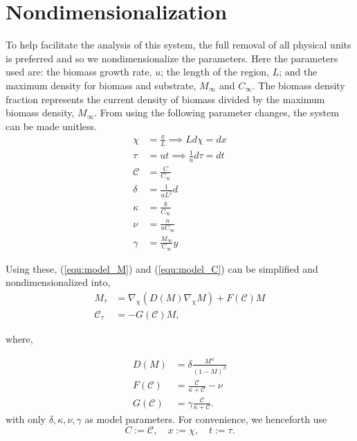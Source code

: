\section{Nondimensionalization}
 

To help facilitate the analysis of this system, the full removal of all physical units is preferred and so we nondimensionalize the parameters.
Here the parameters used are: the biomass growth rate, $u$; the length of the region, $L$; and the maximum density for biomass and substrate, $M_\infty$ and $C_\infty$.
The biomass density fraction represents the current density of biomass divided by the maximum biomass density, $M_{\infty}$.
From using the following parameter changes, the system can be made unitless.
\begin{align}
  \chi &= \frac{x}{L} \implies L d\chi= dx \\
  \tau &= u t \implies \frac{1}{u} d\tau= dt \\
  \mathcal{C} &= \frac{C}{C_{\infty}} \\
  \delta &= \frac{1}{u L^2} d \\
  \kappa &= \frac{k}{C_\infty} \\
  \nu &= \frac{n}{u C_\infty} \\
  \gamma &= \frac{M_\infty}{C_\infty} y
\end{align}

Using these, (\ref{equ:model_M}) and (\ref{equ:model_C}) can be simplified and nondimensionalized into, 
\begin{align} \label{equ:model_system}
  M_\tau &= \nabla_\chi \left( D(M) \nabla_\chi M \right) + F(\mathcal{C}) M \\
  \mathcal{C}_\tau &= - G(\mathcal{C}) M, 
\end{align}

where,

\begin{equation}
\begin{aligned} \label{equ:model_functions}
  D(M) &= \delta \frac{M^\alpha}{(1 - M)^\beta} \\
  F(\mathcal{C}) &= \frac{ \mathcal{C}} {\kappa + \mathcal{C}} - \nu \\
  G(\mathcal{C}) &= \gamma \frac{\mathcal{C}}{\kappa +\mathcal{C}}.
\end{aligned}
\end{equation}
with only $\delta, \kappa, \nu, \gamma$ as model parameters. 
For convenience, we henceforth use
\begin{equation}
  C := \mathcal{C},\quad x := \chi,\quad t := \tau.
\end{equation}

